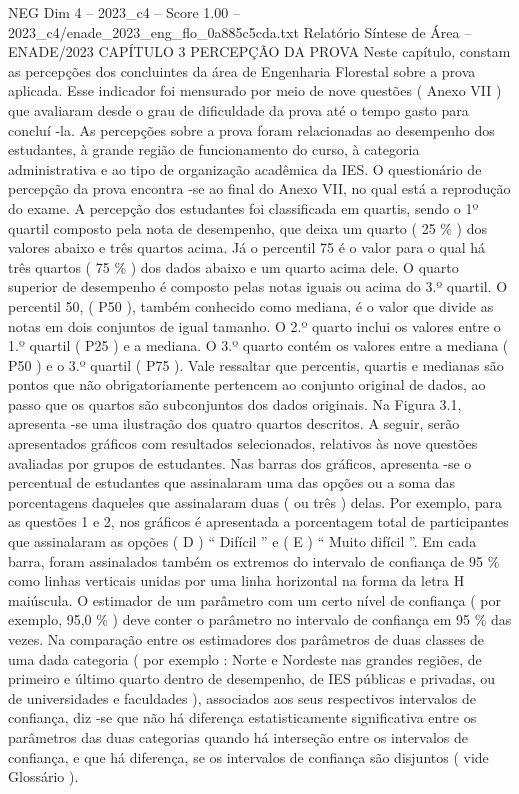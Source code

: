 \begin{textsample}{NEG Dim 4 – 2023\_c4 – Score 1.00 – 2023\_c4/enade\_2023\_eng\_flo\_0a885c5cda.txt}  \label{ex:f4_neg_193}
Relatório Síntese de Área – ENADE/2023 CAPÍTULO 3 PERCEPÇÃO DA PROVA Neste capítulo, constam as percepções dos concluintes da área de Engenharia Florestal sobre a prova aplicada.
Esse indicador foi mensurado por meio de nove questões ( Anexo VII ) que avaliaram desde o grau de dificuldade da prova até o tempo gasto para concluí -la.
As percepções sobre a prova foram relacionadas ao desempenho dos estudantes, à grande região de funcionamento do curso, à categoria administrativa e ao tipo de organização acadêmica da IES.
O questionário de percepção da prova encontra -se ao final do Anexo VII, no qual está a reprodução do exame.
A percepção dos estudantes foi classificada em quartis, sendo o 1º quartil composto pela nota de desempenho, que deixa um quarto ( 25 \% ) dos valores abaixo e três quartos acima.
Já o percentil 75 é o valor para o qual há três quartos ( 75 \% ) dos dados abaixo e um quarto acima dele.
O quarto superior de desempenho é composto pelas notas iguais ou acima do 3.º quartil.
O percentil 50, ( P50 ), também conhecido como mediana, é o valor que divide as notas em dois conjuntos de igual tamanho.
O 2.º quarto inclui os valores entre o 1.º quartil ( P25 ) e a mediana.
O 3.º quarto contém os valores entre a mediana ( P50 ) e o 3.º quartil ( P75 ).
Vale ressaltar que percentis, quartis e medianas são pontos que não obrigatoriamente pertencem ao conjunto original de dados, ao passo que os quartos são subconjuntos dos dados originais.
Na Figura 3.1, apresenta -se uma ilustração dos quatro quartos descritos.
A seguir, serão apresentados gráficos com resultados selecionados, relativos às nove questões avaliadas por grupos de estudantes.
Nas barras dos gráficos, apresenta -se o percentual de estudantes que assinalaram uma das opções ou a soma das porcentagens daqueles que assinalaram duas ( ou três ) delas.
Por exemplo, para as questões 1 e 2, nos gráficos é apresentada a porcentagem total de participantes que assinalaram as opções ( D ) “ Difícil ” e ( E ) “ Muito difícil ”.
Em cada barra, foram assinalados também os extremos do intervalo de confiança de 95 \% como linhas verticais unidas por uma linha horizontal na forma da letra H maiúscula.
O estimador de um parâmetro com um certo nível de confiança ( por exemplo, 95,0 \% ) deve conter o parâmetro no intervalo de confiança em 95 \% das vezes.
Na comparação entre os estimadores dos parâmetros de duas classes de uma dada categoria ( por exemplo : Norte e Nordeste nas grandes regiões, de primeiro e último quarto dentro de desempenho, de IES públicas e privadas, ou de universidades e faculdades ), associados aos seus respectivos intervalos de confiança, diz -se que não há diferença estatisticamente significativa entre os parâmetros das duas categorias quando há interseção entre os intervalos de confiança, e que há diferença, se os intervalos de confiança são disjuntos ( vide Glossário ).

\end{textsample}
